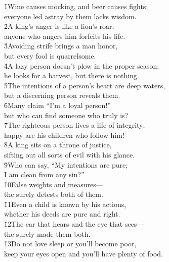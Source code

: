 \begin{poetry}
\poeml {}
\v{1}Wine causes mocking, and beer causes fights; \\
\poeml everyone led astray by them lacks wisdom. \\
\poeml \v{2}A king's anger is like a lion's roar; \\
\poemll    anyone who angers him forfeits his life. \\
\poeml \v{3}Avoiding strife brings a man honor, \\
\poemll    but every fool is quarrelsome. \\
\poeml \v{4}A lazy person doesn't plow in the proper season; \\
\poemll    he looks for a harvest, but there is nothing. \\
\poeml \v{5}The intentions of a person's heart are deep waters, \\
\poemll    but a discerning person reveals them. \\
\poeml \v{6}Many claim ``I'm a loyal person!'' \\
\poemll    but who can find someone who truly is? \\
\poeml \v{7}The righteous person lives a life of integrity; \\
\poemll    happy are his children who follow him! \\
\poeml \v{8}A king sits on a throne of justice, \\
\poemll    sifting out all sorts of evil with his glance. \\
\poeml \v{9}Who can say, ``My intentions are pure; \\
\poemll    I am clean from any sin?'' \\
\poeml \v{10}False weights and measures--- \\
\poemll    the  surely detests both of them. \\
\poeml \v{11}Even a child is known by his actions, \\
\poemll    whether his deeds are pure and right. \\
\poeml \v{12}The ear that hears and the eye that sees--- \\
\poemll    the  surely made them both. \\
\poeml \v{13}Do not love sleep or you'll become poor, \\
\poemll    keep your eyes open and you'll have plenty of food. \\

\end{poetry}
